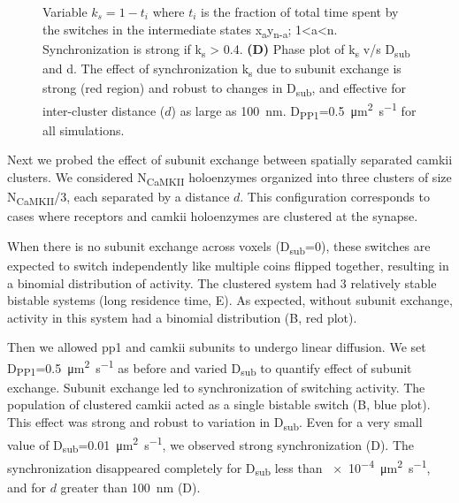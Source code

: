 \documentclass[9pt,lineno,doublespacing]{elife}
\newcommand\SUB[2]{#1\textsubscript{#2}}
\begin{document}
\begin{figure}
{        Variable $k_s=1-t_i$ where $t_i$ is the fraction of total time spent by
        the switches in the intermediate states
        x\textsubscript{a}y\textsubscript{n-a}; 1\textless{}a\textless{}n.
        Synchronization is strong if k\textsubscript{s} \textgreater{} 0.4.
        \textbf{(D)} Phase plot of \SUB{k}{s} v/s \SUB{D}{sub} and d. The effect
        of synchronization \SUB{k}{s} due to subunit exchange is strong (red
        region) and robust to changes in \SUB{D}{sub}, and effective for
        inter-cluster distance ($d$) as large as \SI{100}{\nano\meter}. 
        \SUB{D}{PP1}=\SI{0.5}{\micro\meter\squared\per\second} for all
        simulations.
    }\label{fig:sync_spread}
\end{figure}

Next we probed the effect of subunit exchange between spatially separated
\gls{camkii} clusters. We considered \SUB{N}{CaMKII} holoenzymes organized into
three clusters of size \SUB{N}{CaMKII}/3, each separated by a distance \(d\).
This configuration corresponds to cases where receptors and \gls{camkii}
holoenzymes are clustered at the synapse. 

When there is no subunit exchange across voxels (\SUB{D}{sub}=0), these switches
are expected to switch independently like multiple coins flipped together,
resulting in a binomial distribution of activity. The clustered system had 3
relatively stable bistable systems (long residence time, E). As
expected, without subunit exchange, activity in this system had a binomial
distribution (B, red plot). 

Then we allowed \gls{pp1} and \gls{camkii} subunits to undergo linear diffusion.
We set \SUB{D}{PP1}=\SI{0.5}{\micro\meter\squared\per\second} as before and
varied \SUB{D}{sub} to quantify effect of subunit exchange. Subunit exchange led
to synchronization of switching activity. The population of clustered
\gls{camkii} acted as a single bistable switch (B, blue plot).
This effect was strong and robust to variation in \SUB{D}{sub}. Even for a very
small value of \SUB{D}{sub}=\SI{0.01}{\micro\meter\squared\per\second}, we
observed strong synchronization (D). The synchronization
disappeared completely for \SUB{D}{sub} less than
\SI{e-4}{\micro\meter\squared\per\second}, and for $d$ greater than
\SI{100}{\nano\meter} (D).
\end{document}
